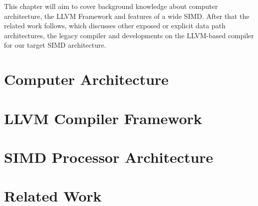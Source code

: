 This chapter will aim to cover background knowledge about computer architecture, the LLVM Framework and features of a wide SIMD. After that the related work follows, which discusses other exposed or explicit data path architectures, the legacy compiler and developments on the LLVM-based compiler for our target SIMD architecture.

\section{Computer Architecture}\label{sec:arch}


\section{LLVM Compiler Framework}\label{sec:llvm}


\section{SIMD Processor Architecture}\label{sec:simd}


\section{Related Work}\label{sec:related_work}
